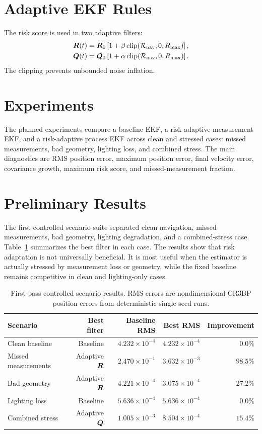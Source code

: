 \documentclass[11pt]{article}
\begin{document}
\section{Adaptive EKF Rules}

The risk score is used in two adaptive filters:
\begin{align}
  \bm{R}(t) &= \bm{R}_0\left[1+\beta\,\mathrm{clip}(\mathcal{R}_{\mathrm{nav}},0,R_{\max})\right],\\
  \bm{Q}(t) &= \bm{Q}_0\left[1+\alpha\,\mathrm{clip}(\mathcal{R}_{\mathrm{nav}},0,R_{\max})\right].
\end{align}
The clipping prevents unbounded noise inflation.

\section{Experiments}

The planned experiments compare a baseline EKF, a risk-adaptive measurement
EKF, and a risk-adaptive process EKF across clean and stressed cases:
missed measurements, bad geometry, lighting loss, and combined stress. The
main diagnostics are RMS position error, maximum position error, final velocity
error, covariance growth, maximum risk score, and missed-measurement fraction.

\section{Preliminary Results}

The first controlled scenario suite separated clean navigation, missed
measurements, bad geometry, lighting degradation, and a combined-stress case.
Table~\ref{tab:scenario-summary} summarizes the best filter in each case. The
results show that risk adaptation is not universally beneficial. It is most
useful when the estimator is actually stressed by measurement loss or geometry,
while the fixed baseline remains competitive in clean and lighting-only cases.

\begin{table}[ht]
  \centering
  \caption{First-pass controlled scenario results. RMS errors are nondimensional
  CR3BP position errors from deterministic single-seed runs.}
  \label{tab:scenario-summary}
  \begin{tabular}{lrrrr}
    \toprule
    Scenario & Best filter & Baseline RMS & Best RMS & Improvement\\
    \midrule
    Clean baseline & Baseline & $4.232{\times}10^{-4}$ & $4.232{\times}10^{-4}$ & $0.0\%$\\
    Missed measurements & Adaptive $\bm{R}$ & $2.470{\times}10^{-1}$ & $3.632{\times}10^{-3}$ & $98.5\%$\\
    Bad geometry & Adaptive $\bm{R}$ & $4.221{\times}10^{-4}$ & $3.075{\times}10^{-4}$ & $27.2\%$\\
    Lighting loss & Baseline & $5.636{\times}10^{-4}$ & $5.636{\times}10^{-4}$ & $0.0\%$\\
    Combined stress & Adaptive $\bm{Q}$ & $1.005{\times}10^{-3}$ & $8.504{\times}10^{-4}$ & $15.4\%$\\
    \bottomrule
  \end{tabular}
\end{table}
\end{document}
